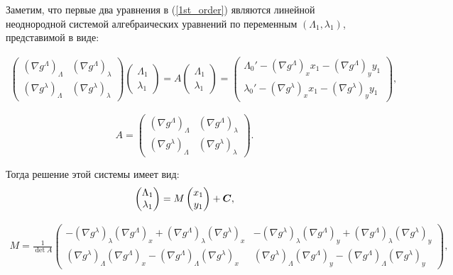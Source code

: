 \begin{enumerate}
Заметим, что первые два уравнения в (\ref{1st_order}) являются линейной неоднородной системой алгебраических уравнений по переменным $(\Lambda_1, \lambda_1)$, представимой в виде:

\begin{align*}
\begin{pmatrix}
(\nabla g^\Lambda)_\Lambda & (\nabla g^\Lambda)_\lambda \\
(\nabla g^\lambda)_\Lambda & (\nabla g^\lambda)_\lambda
\end{pmatrix}
\begin{pmatrix} \Lambda_1 \\ \lambda_1 \end{pmatrix}
= A \begin{pmatrix} \Lambda_1 \\ \lambda_1 \end{pmatrix} =
\begin{pmatrix} \Lambda_0' - (\nabla g^\Lambda)_x x_1 - (\nabla g^\Lambda)_y y_1 \\ \lambda_0' - (\nabla g^\lambda)_x x_1 - (\nabla g^\lambda)_y y_1 \end{pmatrix},
\end{align*}

\begin{equation*}
A = \begin{pmatrix}
(\nabla g^\Lambda)_\Lambda & (\nabla g^\Lambda)_\lambda \\
(\nabla g^\lambda)_\Lambda & (\nabla g^\lambda)_\lambda
\end{pmatrix}.
\end{equation*}

Тогда решение этой системы имеет вид:
\begin{align*}
    \begin{pmatrix} \Lambda_1 \\ \lambda_1 \end{pmatrix} = 
    M \begin{pmatrix} x_1 \\ y_1 \end{pmatrix} + \boldsymbol{C},
\end{align*}

\begin{align*}
    M = \frac{1}{\det A} \begin{pmatrix} 
        -(\nabla g^\lambda)_\lambda (\nabla g^\Lambda)_x + (\nabla g^\Lambda)_\lambda (\nabla g^\lambda)_x & -(\nabla g^\lambda)_\lambda (\nabla g^\Lambda)_y + (\nabla g^\Lambda)_\lambda (\nabla g^\lambda)_y \\ 
         (\nabla g^\lambda)_\Lambda (\nabla g^\Lambda)_x - (\nabla g^\Lambda)_\Lambda (\nabla g^\lambda)_x &  (\nabla g^\lambda)_\Lambda (\nabla g^\Lambda)_y - (\nabla g^\Lambda)_\Lambda (\nabla g^\lambda)_y
    \end{pmatrix},
\end{align*}


\end{enumerate}
